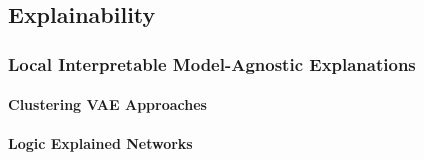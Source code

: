 



\subsection{Explainability}
\subsubsection{Local Interpretable Model-Agnostic Explanations}






\paragraph{Clustering VAE Approaches}






\paragraph{Logic Explained Networks}